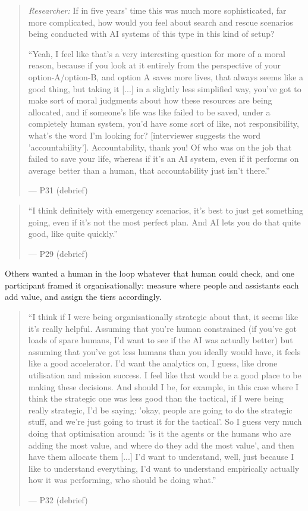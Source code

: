 \begin{quote}\small
{\footnotesize\textit{Researcher:} If in five years' time this was much more sophisticated, far more complicated, how would you feel about search and rescue scenarios being conducted with AI systems of this type in this kind of setup?}\par\smallskip
``Yeah, I feel like that's a very interesting question for more of a moral reason, because if you look at it entirely from the perspective of your option-A/option-B, and option A saves more lives, that always seems like a good thing, but taking it [...] in a slightly less simplified way, you've got to make sort of moral judgments about how these resources are being allocated, and if someone's life was like failed to be saved, under a completely human system, you'd have some sort of like, not responsibility, what's the word I'm looking for? [interviewer suggests the word 'accountability']. Accountability, thank you! Of who was on the job that failed to save your life, whereas if it's an AI system, even if it performs on average better than a human, that accountability just isn't there.''\par\hfill--- P31 (debrief)
\end{quote}

\begin{quote}\small
``I think definitely with emergency scenarios, it's best to just get something going, even if it's not the most perfect plan. And AI lets you do that quite good, like quite quickly.''\par\hfill--- P29 (debrief)
\end{quote}

\label{sec:qual:who-decides:loop}
Others wanted a human in the loop whatever that human could check, and one participant framed it organisationally: measure where people and assistants each add value, and assign the tiers accordingly.

\begin{quote}\small
``I think if I were being organisationally strategic about that, it seems like it's really helpful. Assuming that you're human constrained (if you've got loads of spare humans, I'd want to see if the AI was actually better) but assuming that you've got less humans than you ideally would have, it feels like a good accelerator. I'd want the analytics on, I guess, like drone utilisation and mission success. I feel like that would be a good place to be making these decisions. And should I be, for example, in this case where I think the strategic one was less good than the tactical, if I were being really strategic, I'd be saying: 'okay, people are going to do the strategic stuff, and we're just going to trust it for the tactical'. So I guess very much doing that optimisation around: 'is it the agents or the humans who are adding the most value, and where do they add the most value', and then have them allocate them [...] I'd want to understand, well, just because I like to understand everything, I'd want to understand empirically actually how it was performing, who should be doing what.''\par\hfill--- P32 (debrief)
\end{quote}

